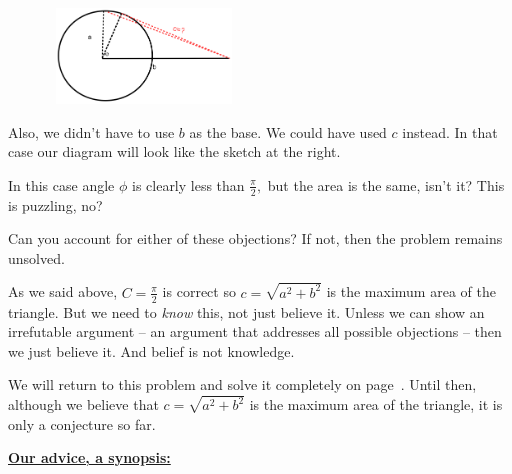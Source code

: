 \begin{figure}
\captionsetup{labelformat=empty}
\centerline{\includegraphics*[height=1in,width=2in]{Figures/Advice6}}
\label{fig:}
\end{figure}
Also, we didn't have to use $b$ as the base. We could have used $c$
instead.  In that case our diagram will look like the sketch at the
right.

In this case angle $\phi$ is clearly less than $\frac{\pi}{2},$ but
the area is the same, isn't it? This is puzzling, no? 

Can you account for either of these objections? If not, then the
problem remains unsolved.

As we said above, $C=\frac{\pi}{2}$ is correct so $c=\sqrt{a^2+b^2}$
is the maximum area of the triangle. But we need to \emph{know} this,
not just believe it. Unless we can show an irrefutable argument -- an
argument that addresses all possible objections -- then we just
believe it. And belief is not knowledge.

We will return to this problem and solve it completely on
page~\pageref{}. Until then, although we believe that
$c=\sqrt{a^2+b^2}$ is the maximum area of the triangle, it is only a
conjecture so far.

\noindent{}\underline{\bf{}Our advice, a synopsis:}\\

